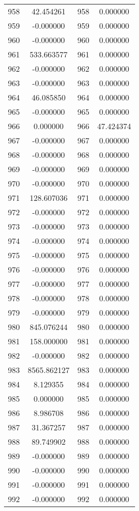 \documentclass[12pt]{article}
\begin{document}
\begin{longtable}{@{}cccc@{}}
958 & 42.454261 & 958 & 0.000000 \\
959 & -0.000000 & 959 & 0.000000 \\
960 & -0.000000 & 960 & 0.000000 \\
961 & 533.663577 & 961 & 0.000000 \\
962 & -0.000000 & 962 & 0.000000 \\
963 & -0.000000 & 963 & 0.000000 \\
964 & 46.085850 & 964 & 0.000000 \\
965 & -0.000000 & 965 & 0.000000 \\
966 & 0.000000 & 966 & 47.424374 \\
967 & -0.000000 & 967 & 0.000000 \\
968 & -0.000000 & 968 & 0.000000 \\
969 & -0.000000 & 969 & 0.000000 \\
970 & -0.000000 & 970 & 0.000000 \\
971 & 128.607036 & 971 & 0.000000 \\
972 & -0.000000 & 972 & 0.000000 \\
973 & -0.000000 & 973 & 0.000000 \\
974 & -0.000000 & 974 & 0.000000 \\
975 & -0.000000 & 975 & 0.000000 \\
976 & -0.000000 & 976 & 0.000000 \\
977 & -0.000000 & 977 & 0.000000 \\
978 & -0.000000 & 978 & 0.000000 \\
979 & -0.000000 & 979 & 0.000000 \\
980 & 845.076244 & 980 & 0.000000 \\
981 & 158.000000 & 981 & 0.000000 \\
982 & -0.000000 & 982 & 0.000000 \\
983 & 8565.862127 & 983 & 0.000000 \\
984 & 8.129355 & 984 & 0.000000 \\
985 & 0.000000 & 985 & 0.000000 \\
986 & 8.986708 & 986 & 0.000000 \\
987 & 31.367257 & 987 & 0.000000 \\
988 & 89.749902 & 988 & 0.000000 \\
989 & -0.000000 & 989 & 0.000000 \\
990 & -0.000000 & 990 & 0.000000 \\
991 & -0.000000 & 991 & 0.000000 \\
992 & -0.000000 & 992 & 0.000000 \\

\end{longtable}
\end{document}
